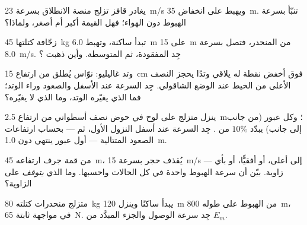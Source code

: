 \begin{exercise}[$\star\star$]\label{exo:g11:mechanical-energy:9}
يغادر قافز تزلج منصة الانطلاق بسرعة \qty{23}{m/s} ويهبط على انخفاض \qty{35}{m}.
تنبّأ بسرعة الهبوط دون  الهواء؛ فهل القيمة 
أكبر أم أصغر، ولماذا؟
\end{exercise}

\begin{exercise}[$\star\star$]\label{exo:g11:mechanical-energy:10}
زحّافة كتلتها \qty{45}{kg} تبدأ ساكنة، وتهبط \qty{6.0}{m} على
\qty{15}{m} من المنحدر، فتصل بسرعة \qty{8.0}{m/s}. جِد  المفقودة، ثم   المتوسطة. وأين ذهبت ؟
\end{exercise}

\begin{exercise}[$\star\star$]\label{exo:g11:mechanical-energy:11}
وتد غاليليو: نوّاس يُطلق من ارتفاع \qty{15}{cm} فوق أخفض نقطة له
يلاقي وتدًا يحجز النصف الأعلى من الخيط عند الوضع الشاقولي. جِد
السرعة عند الأسفل والصعود وراء الوتد؛ فما الذي يغيّره الوتد،
وما الذي لا يغيّره؟
\end{exercise}

\begin{exercise}[$\star\star\star$]\label{exo:g11:mechanical-energy:12}
ينزل متزلج على لوح في حوض نصف أسطواني من ارتفاع \qty{2.5}{m}؛ وكل عبور
(من جانب إلى جانب) يبدّد $10\%$ من . جِد
السرعة عند أسفل النزول الأول، ثم --- بحساب
ارتفاعات الصعود المتتالية --- أول عبور ينتهي دون \qty{1.0}{m}.
\end{exercise}

\begin{exercise}[$\star\star\star$]\label{exo:g11:mechanical-energy:13}
من قمة جرف ارتفاعه \qty{45}{m}، يُقذف حجر بسرعة \qty{15}{m/s} ---
إلى أعلى، أو أفقيًّا، أو بأي زاوية. بيّن أن سرعة الهبوط
واحدة في كل الحالات واحسبها. وما الذي \emph{يتوقف} على الزاوية؟
\end{exercise}

\begin{exercise}[$\star\star\star$]\label{exo:g11:mechanical-energy:14}
متزلج منحدرات كتلته \qty{80}{kg} يبدأ ساكنًا وينزل \qty{120}{m}
من الهبوط على  طوله \qty{800}{m}، في مواجهة   ثابتة
\qty{65}{N}. جِد سرعة الوصول والجزء المبدَّد من $E_m$.
\end{exercise}

